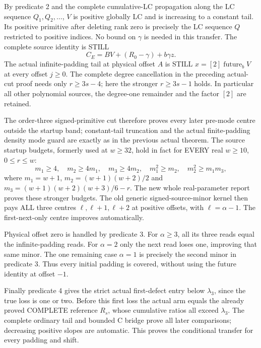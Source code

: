 By predicate 2 and the complete cumulative-LC propagation along the
LC sequence $Q_1,Q_2,\ldots$, $V$ is positive globally LC and is
increasing to a constant tail. Its positive primitive after deleting
rank zero is precisely the LC sequence $Q$ restricted to positive
indices. No bound on $\gamma$ is needed in this transfer.
The complete source identity is STILL
\[
 C_E=BV+(R_0-\gamma)+b\gamma z.                            \tag{3}
\]
The actual infinite-padding tail at physical offset $A$ is STILL
$x=[2]\operatorname{future}_b V$ at every offset $j\ge0$.
The complete degree cancellation in the preceding actual-cut proof
needs only $r\ge3s-4$; here the stronger $r\ge3s-1$ holds.
In particular all other polynomial sources, the degree-one remainder
and the factor $[2]$ are retained.

The order-three signed-primitive cut therefore proves every later
pre-mode centre outside the startup band; constant-tail truncation
and the actual finite-padding density mode guard are exactly as in
the previous actual theorem. The source startup budgets, formerly
used at $w\ge32$, hold in fact for EVERY real $w\ge10$, $0\le r\le w$:
\[
 m_1\ge4,\quad m_2\ge4m_1,\quad m_3\ge4m_2,
 \quad m_1^2\ge m_2,\quad m_2^2\ge m_1m_3,
\]
where $m_1=w+1$, $m_2=(w+1)(w+2)/2$ and
$m_3=(w+1)(w+2)(w+3)/6-r$.
The new whole real-parameter report proves these stronger budgets.
The old generic signed-source-minor kernel then pays ALL three
centres $\ell,\ell+1,\ell+2$ at positive offsets, with
$\ell=\alpha-1$. The first-next-only centre improves automatically.

Physical offset zero is handled by predicate 3. For $\alpha\ge3$,
all its three reads equal the infinite-padding reads. For $\alpha=2$
only the next read loses one, improving that same minor. The one
remaining case $\alpha=1$ is precisely the second minor in predicate 3.
Thus every initial padding is covered, without using the future
identity at offset $-1$.

Finally predicate 4 gives the strict actual first-defect entry below
$\lambda_3$, since the true loss is one or two. Before this first
loss the actual arm equals the already proved COMPLETE reference
$R_s$, whose cumulative ratios all exceed $\lambda_3$.
The complete ordinary tail and bounded C bridge prove all later
comparisons; decreasing positive slopes are automatic.
This proves the conditional transfer for every padding and shift.

